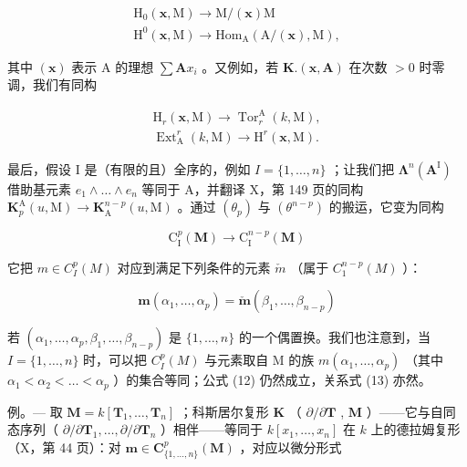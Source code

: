 \[
\begin{array}{l} \mathrm{H} _ {0} (\boldsymbol {x}, \mathrm{M}) \to \mathrm{M} / (\boldsymbol {x}) \mathrm{M} \\ \mathrm{H} ^ {0} (\boldsymbol {x}, \mathrm{M}) \to \mathrm{Hom} _ {\mathrm{A}} \left(\mathrm{A} / (\boldsymbol {x}), \mathrm{M}\right), \end{array}
\]

其中 \((\pmb{x})\) 表示 A 的理想 \(\sum \mathbf{A}x_{i}\) 。又例如，若 \(\mathbf{K}.(\pmb{x},\mathbf{A})\) 在次数 \(>0\) 时零调，我们有同构

\[
\begin{array}{l}\mathrm{H} _ {r} (\boldsymbol {x}, \mathrm{M}) \rightarrow \operatorname{Tor} _ {r} ^ {\mathrm{A}} (k, \mathrm{M}),\\\operatorname{Ext} _ {\mathrm{A}} ^ {r} (k, \mathrm{M}) \rightarrow \mathrm{H} ^ {r} (\boldsymbol {x}, \mathrm{M}).\end{array}
\]

最后，假设 I 是（有限的且）全序的，例如 \(I = \{1, \ldots, n\}\) ；让我们把 \(\symbf{\Lambda}^{n}(\mathbf{A}^{\mathrm{I}})\) 借助基元素 \(e_{1} \wedge \ldots \wedge e_{n}\) 等同于 A，并翻译 X，第 149 页的同构 \(\mathbf{K}_{p}^{\mathrm{A}}(u, \mathrm{M}) \to \mathbf{K}_{\mathrm{A}}^{n-p}(u, \mathrm{M})\) 。通过 \((\theta_{p})\) 与 \((\theta^{n-p})\) 的搬运，它变为同构

\[
\mathrm{C} _ {\mathrm{I}} ^ {p} (\mathbf {M}) \rightarrow \mathrm{C} _ {\mathrm{I}} ^ {n - p} (\mathbf {M})
\]

它把 \(m \in C_{I}^{p}(M)\) 对应到满足下列条件的元素 \(\check{m}\) （属于 \(C_{1}^{n-p}(M)\) ）：

\[
\boldsymbol {m} \left(\alpha_ {1}, \dots , \alpha_ {p}\right) = \check {\boldsymbol {m}} \left(\beta_ {1}, \dots , \beta_ {n - p}\right)\tag{13}
\]

若 \((\alpha_{1},\ldots,\alpha_{p},\beta_{1},\ldots,\beta_{n-p})\) 是 \(\{1,\ldots,n\}\) 的一个偶置换。我们也注意到，当 \(I=\{1,\ldots,n\}\) 时，可以把 \(C_{I}^{p}(M)\) 与元素取自 M 的族 \(m(\alpha_{1},\ldots,\alpha_{p})\) （其中 \(\alpha_{1}<\alpha_{2}<\ldots<\alpha_{p}\) ）的集合等同；公式 (12) 仍然成立，关系式 (13) 亦然。

例。--- 取 \(\mathbf{M} = k[\mathbf{T}_1, \ldots, \mathbf{T}_n]\) ；科斯居尔复形 \(\mathbf{K}\) （ \(\partial/\partial\mathbf{T}\) , \(\mathbf{M}\) ）——它与自同态序列（ \(\partial/\partial\mathbf{T}_1, \ldots, \partial/\partial\mathbf{T}_n\) ）相伴——等同于 \(k[x_{1},\ldots,x_{n}]\) 在 \(k\) 上的德拉姆复形（X，第 44 页）：对 \(\boldsymbol{m}\in\mathbf{C}_{\{1,\ldots,n\}}^{p}(\mathbf{M})\) ，对应以微分形式

